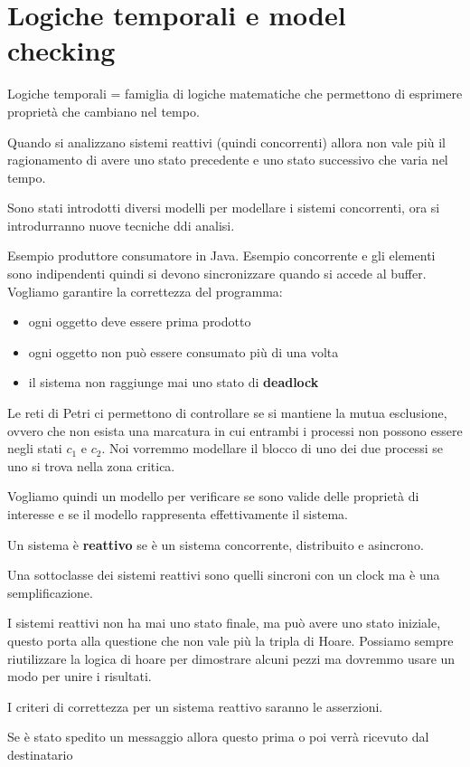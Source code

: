 \chapter{Logiche temporali e model checking}
Logiche temporali = famiglia di logiche matematiche che permettono di esprimere 
proprietà che cambiano nel tempo.

Quando si analizzano sistemi reattivi (quindi concorrenti) allora non vale più 
il ragionamento di avere uno stato precedente e uno stato successivo che varia nel
tempo.

Sono stati introdotti diversi modelli per modellare i sistemi concorrenti, ora 
si introdurranno nuove tecniche ddi analisi.

Esempio produttore consumatore in Java. Esempio concorrente e gli elementi sono
indipendenti quindi si devono sincronizzare quando si accede al buffer. Vogliamo
garantire la correttezza del programma:
\begin{itemize}
    \item ogni oggetto deve essere prima prodotto
    \item ogni oggetto non può essere consumato più di una volta
    \item il sistema non raggiunge mai uno stato di \textbf{deadlock}
\end{itemize}


Le reti di Petri ci permettono di controllare se si mantiene la mutua esclusione,
ovvero che non esista una  marcatura in cui entrambi i processi non possono essere
negli stati $c_1$ e $c_2$. Noi vorremmo modellare il blocco di uno dei due processi se 
uno si trova nella zona critica.

Vogliamo quindi un modello per verificare se sono valide delle proprietà di interesse
e se il modello rappresenta effettivamente il sistema.

\begin{definizione}
    Un sistema è \textbf{reattivo} se è un sistema concorrente, distribuito e asincrono.
\end{definizione}
Una sottoclasse dei sistemi reattivi sono quelli sincroni con un clock ma è una semplificazione.

I sistemi reattivi non ha mai uno stato finale, ma può avere uno stato iniziale,
questo porta alla questione che non vale più la tripla di Hoare. Possiamo sempre
riutilizzare la logica di hoare per dimostrare alcuni pezzi ma dovremmo usare un modo
per unire i risultati.

I criteri di correttezza per un sistema reattivo saranno le asserzioni.
\begin{esempio}
    Se è stato spedito un messaggio allora questo prima o poi verrà ricevuto dal
    destinatario
\end{esempio}

